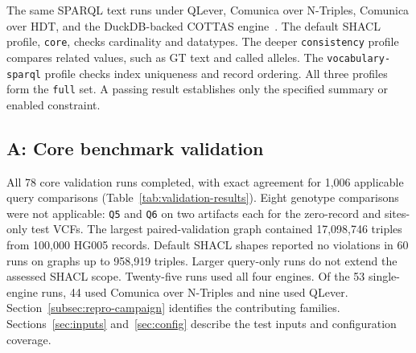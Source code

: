 \documentclass[11pt]{article}
\begin{document}
The same SPARQL text runs under QLever, Comunica over N-Triples, Comunica over HDT, and the DuckDB-backed COTTAS engine~\cite{qlever_2017,Taelman2018Comunica,comunica_file_docs_2026,comunica_hdt_docs_2026,comunica_cottas_2026}.
The default SHACL profile, \texttt{core}, checks cardinality and datatypes.
The deeper \texttt{consistency} profile compares related values, such as GT text and called alleles.
The \texttt{vocabulary-sparql} profile checks index uniqueness and record ordering.
All three profiles form the \texttt{full} set.
A passing result establishes only the specified summary or enabled constraint.

\subsection{A: Core benchmark validation}\label{subsec:validation-comparisons}
All 78 core validation runs completed, with exact agreement for 1,006 applicable query comparisons (Table~\ref{tab:validation-results}).
Eight genotype comparisons were not applicable: \texttt{Q5} and \texttt{Q6} on two artifacts each for the zero-record and sites-only test VCFs.
The largest paired-validation graph contained 17,098,746 triples from 100,000 HG005 records.
Default SHACL shapes reported no violations in 60 runs on graphs up to 958,919 triples.
Larger query-only runs do not extend the assessed SHACL scope.
Twenty-five runs used all four engines.
Of the 53 single-engine runs, 44 used Comunica over N-Triples and nine used QLever.
Section~\ref{subsec:repro-campaign} identifies the contributing families.
Sections~\ref{sec:inputs} and~\ref{sec:config} describe the test inputs and configuration coverage.
\end{document}
